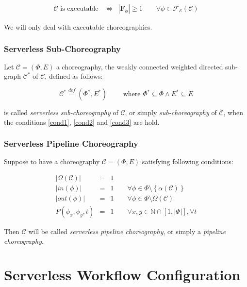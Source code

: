 \documentclass[12pt,a4paper]{report}
\newcommand{\mathDef}{\overset{\textit{def}}{=}}
\newcommand{\N}{\mathbb{N}}
\newcommand{\SetFromOneTo}[1]{\N \cap \left[1,#1\right]}
\begin{document}
\begin{eqnarray}
	\label{eqn:SchedulabilityConditionOne}
	\mathcal{C} \text{ is executable } & \Leftrightarrow & |\textbf{F}_{\phi}| \geq 1 \qquad \forall \phi \in \mathscr{F_E}(\mathcal{C})
\end{eqnarray}

We will only deal with executable choreographies.

\subsubsection{Serverless Sub-Choreography}

Let $\mathcal{C} = (\Phi,E)$ a choreography, the weakly connected weighted directed sub-graph $\mathcal{C}^*$ of $\mathcal{C}$, defined as follows:

\begin{equation}
	\mathcal{C}^* \mathDef (\Phi^*,E^*) \qquad \text{ where } \Phi^* \subseteq \Phi \wedge E^* \subseteq E
\end{equation}

is called \textit{serverless sub-choreography} of $\mathcal{C}$, or simply \textit{sub-choreography} of $\mathcal{C}$, when the conditions \ref{cond1}, \ref{cond2} and \ref{cond3} are hold.

\subsubsection{Serverless Pipeline Choreography}\label{PipelineDefinitionSection}

Suppose to have a choreography $\mathcal{C} = (\Phi,E)$ satisfying following conditions:

\begin{eqnarray}
	|\Omega(\mathcal{C})| & = & 1 \label{pipeline0} \\
	|in(\phi)| & = & 1 \qquad \forall \phi \in \Phi \setminus \left\{ \alpha(\mathcal{C}) \right\} \label{pipeline1} \\
	|out(\phi)| & = & 1 \qquad \forall \phi \in \Phi \setminus \Omega(\mathcal{C}) \label{pipeline2} \\
	P(\phi_x, \phi_y, t) & = & 1 \qquad \forall x,y \in \SetFromOneTo{|\Phi|}, \forall t \label{pipeline3}
\end{eqnarray}

Then $\mathcal{C}$ will be called \textit{serverless pipeline choreography}, or simply a \textit{pipeline choreography}.

\section{Serverless Workflow Configuration}
\end{document}
